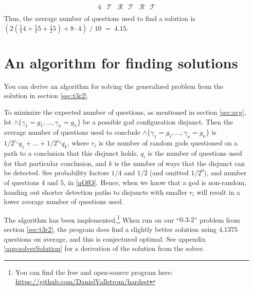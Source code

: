 \documentclass[twoside,twocolumn,a4paper,11pt]{article}
\theoremstyle{definition}
\begin{document}
\begin{equation}
\begin{matrix}
  4       & \mathcal{T} & \mathcal{R} & \mathcal{T} & \mathcal{R} & \mathcal{T} \\
 \end{matrix}
\end{equation}
Thus, the average number of questions used to find a solution is
$ ( 2(\frac{1}{4}4 + \frac{1}{4}5 + \frac{1}{2}5) + 8\cdot 4 ) \;/\; 10 \;=\; 4.15 $.



\enlargethispage{-1.5\baselineskip}



\section{An algorithm for finding solutions}
\label{sec:algo}

You can derive an algorithm for solving the generalized problem from the solution in 
section \ref{sec:t3r2}. 

To minimize the expected number of questions, as mentioned in 
section \ref{sec:avg}, 
let $\land\{\gamma_1=g_1, \ldots, \gamma_n=g_n\}$ be a possible god configuration disjunct. 
Then the average number of questions used to conclude
$\land\{\gamma_1=g_1, \ldots, \gamma_n=g_n\}$ is
$1/2^{r_1} q_1 + \ldots + 1/2^{r_k} q_k$, where $r_i$ is 
the number of random gods questioned on a path to a conclusion that this disjunct holds,
$q_i$ is the number of questions used for that particular conclusion,
and $k$ is the number of ways that the disjunct can be detected.
See probability factors $1/4$ and $1/2$ (and omitted $1/2^0$), and
number of questions $4$ and $5$, in \eqref{nOfQ}.
Hence, when we know that a god is non-random, handing out shorter detection paths
to disjuncts with smaller $r_i$ will result in a lower average number of questions used.

The algorithm has been 
implemented.\footnote{You
\label{fn:prog} 
can find the free and open-source program here:
\url{https://github.com/DanielVallstrom/hardest}}
%
When run on our ``$0$-$3$-$2$'' problem from section \ref{sec:t3r2}, the program does find
a slightly better solution using $4.1375$ questions on average, and this is 
conjectured
optimal.
See appendix \ref{app:solverSolution} for a derivation of the solution from the solver.
\end{document}

